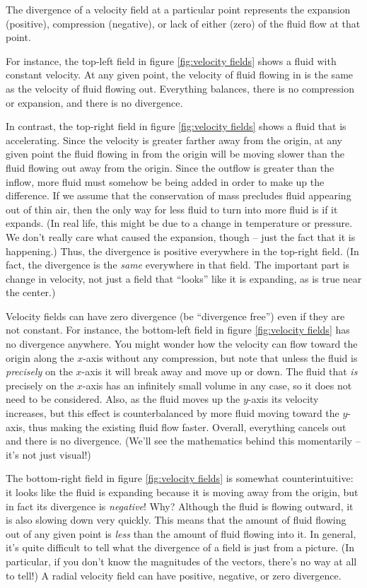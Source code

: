 \documentclass{myarticle}
\theoremstyle{nospace}
\newtheorem{old series theorem}{Theorem}
\newenvironment{series theorem}
{\begin{mdframed}\begin{old series theorem}}
    {\end{old series theorem}\end{mdframed}}
\begin{document}
The divergence of a velocity field at a particular point represents
the expansion (positive), compression (negative), or lack of either
(zero) of the fluid flow at that point.

For instance, the top-left field in figure \ref{fig:velocity fields}
shows a fluid with constant velocity. At any given point, the velocity
of fluid flowing in is the same as the velocity of fluid flowing out.
Everything balances, there is no compression or expansion, and there
is no divergence.

In contrast, the top-right field in figure \ref{fig:velocity fields}
shows a fluid that is accelerating. Since the velocity is greater
farther away from the origin, at any given point the fluid flowing in
from the origin will be moving slower than the fluid flowing out away
from the origin. Since the outflow is greater than the inflow, more
fluid must somehow be being added in order to make up the difference.
If we assume that the conservation of mass precludes fluid appearing
out of thin air, then the only way for less fluid to turn into more
fluid is if it expands. (In real life, this might be due to a change
in temperature or pressure. We don't really care what caused the
expansion, though -- just the fact that it is happening.) Thus, the
divergence is positive everywhere in the top-right field. (In fact,
the divergence is the \textit{same} everywhere in that field. The
important part is change in velocity, not just a field that ``looks''
like it is expanding, as is true near the center.)

Velocity fields can have zero divergence (be ``divergence free'') even
if they are not constant. For instance, the bottom-left field in
figure \ref{fig:velocity fields} has no divergence anywhere. You might
wonder how the velocity can flow toward the origin along the $x$-axis
without any compression, but note that unless the fluid is
\textit{precisely} on the $x$-axis it will break away and move up or
down. The fluid that \textit{is} precisely on the $x$-axis has an
infinitely small volume in any case, so it does not need to be
considered. Also, as the fluid moves up the $y$-axis its velocity
increases, but this effect is counterbalanced by more fluid moving
toward the $y$-axis, thus making the existing fluid flow faster.
Overall, everything cancels out and there is no divergence. (We'll see
the mathematics behind this momentarily -- it's not just visual!)

The bottom-right field in figure \ref{fig:velocity fields} is somewhat
counterintuitive: it looks like the fluid is expanding because it is
moving away from the origin, but in fact its divergence is
\textit{negative}! Why? Although the fluid is flowing outward, it is
also slowing down very quickly. This means that the amount of fluid
flowing out of any given point is \textit{less} than the amount of
fluid flowing into it. In general, it's quite difficult to tell what
the divergence of a field is just from a picture. (In particular, if
you don't know the magnitudes of the vectors, there's no way at all to
tell!) A radial velocity field can have positive, negative, or zero
divergence.
\end{document}
